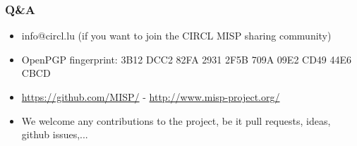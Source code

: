 \begin{frame}
        \frametitle{Q\&A}
        \begin{itemize}
                \item info@circl.lu (if you want to join the CIRCL MISP sharing community)
                \item OpenPGP fingerprint: 3B12 DCC2 82FA 2931 2F5B 709A 09E2 CD49 44E6 CBCD
                \item \url{https://github.com/MISP/} - \url{http://www.misp-project.org/}
                \item We welcome any contributions to the project, be it pull requests, ideas, github issues,...
        \end{itemize}
\end{frame}

